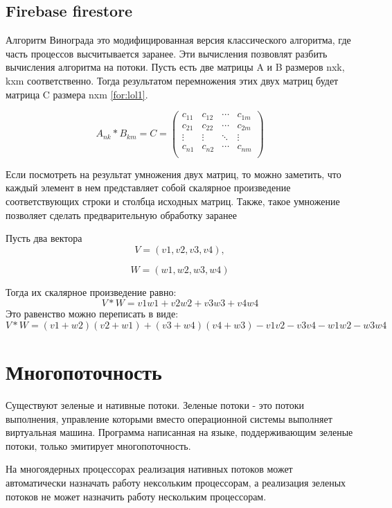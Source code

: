 \documentclass[12pt, a4paper]{report}
\begin{document}
	\subsection{Firebase firestore}
	
	Алгоритм Винограда это модифицированная версия классического алгоритма, где часть процессов высчитывается заранее. Эти вычисления позвовлят разбить вычисления алгоритма на потоки. Пусть есть две матрицы A и B размеров nxk, kxm соответственно. Тогда результатом перемножения этих двух матриц будет матрица C размера nxm \ref{for:lol1}.
	
	\begin{equation}
	A_{nk} * B_{km} = C = \begin{pmatrix}
		c_{11} & c_{12} & \cdots & c_{1m} \\
		c_{21} & c_{22} & \cdots & c_{2m} \\         
		\vdots & \vdots & \ddots & \vdots \\
		c_{n1} & c_{n2} & \cdots & c_{nm} \\
	\end{pmatrix}
	\label{for:lol1}
	\end{equation}
	
	Если посмотреть на результат умножения двух матриц, то можно заметить, что каждый элемент в нем представляет собой скалярное произведение соответствующих строки и столбца исходных матриц. Также, такое умножение позволяет сделать предварительную обработку заранее \cite{Volkova}
	
	Пусть два вектора $$V = (v1, v2, v3, v4), $$
	 
	$$W = (w1, w2, w3, w4)$$
	
	Тогда их скалярное произведение равно: 
	$$V * W = v1w1 + v2w2 + v3w3 + v4w4$$
	Это равенство можно переписать в виде: 
	$$V * W = (v1 + w2)(v2 + w1) + (v3 + w4)(v4 + w3) - 
	v1v2 - v3v4 - w1w2 - w3w4$$
	

	\section{Многопоточность}
	
	\hspace{0.6cm}Существуют зеленые и нативные потоки. Зеленые потоки - это потоки выполнения, управление которыми вместо операционной системы выполняет виртуальная машина. Программа написанная на языке, поддерживающим зеленые потоки, только эмитирует многопоточность. 
	
	\vspace{0.3cm}На многоядерных процессорах реализация нативных потоков может автоматически назначать работу нексольким процессорам, а реализация зеленых потоков не может назначить работу нескольким процессорам.
	
\end{document}
